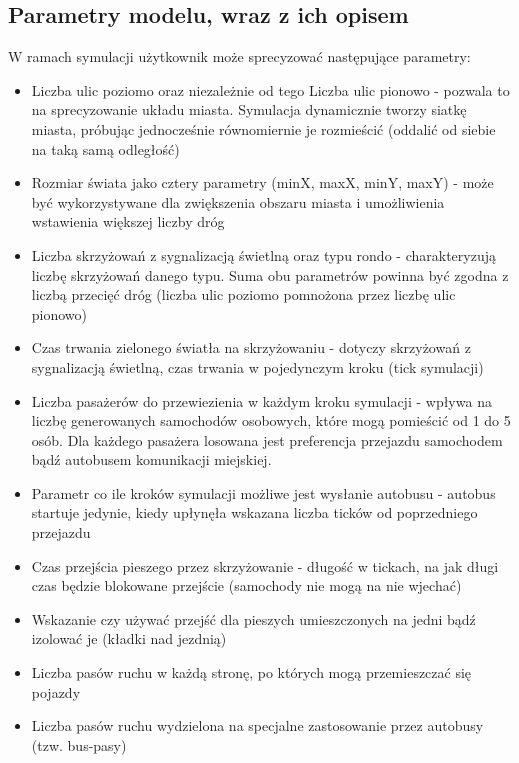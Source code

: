 \documentclass{article}
\begin{document}
\subsection{Parametry modelu, wraz z ich opisem}
\label{subsection:parametry}
W ramach symulacji użytkownik może sprecyzować następujące parametry:
\begin{itemize}
    \item Liczba ulic poziomo oraz niezależnie od tego Liczba ulic pionowo - pozwala to na sprecyzowanie układu miasta. Symulacja dynamicznie tworzy siatkę miasta, próbując jednocześnie równomiernie je rozmieścić (oddalić od siebie na taką samą odległość)
    \item Rozmiar świata jako cztery parametry (minX, maxX, minY, maxY) - może być wykorzystywane dla zwiększenia obszaru miasta i umożliwienia wstawienia większej liczby dróg
    \item Liczba skrzyżowań z sygnalizacją świetlną oraz typu rondo - charakteryzują liczbę skrzyżowań danego typu. Suma obu parametrów powinna być zgodna z liczbą przecięć dróg (liczba ulic poziomo pomnożona przez liczbę ulic pionowo)
    \item Czas trwania zielonego światła na skrzyżowaniu - dotyczy skrzyżowań z sygnalizacją świetlną, czas trwania w pojedynczym kroku (tick symulacji)
    \item Liczba pasażerów do przewiezienia w każdym kroku symulacji - wpływa na liczbę generowanych samochodów osobowych, które mogą pomieścić od 1 do 5 osób. Dla każdego pasażera losowana jest preferencja przejazdu samochodem bądź autobusem komunikacji miejskiej.
    \item Parametr co ile kroków symulacji możliwe jest wysłanie autobusu - autobus startuje jedynie, kiedy upłynęła wskazana liczba ticków od poprzedniego przejazdu
    \item Czas przejścia pieszego przez skrzyżowanie - długość w tickach, na jak długi czas będzie blokowane przejście (samochody nie mogą na nie wjechać)
    \item Wskazanie czy używać przejść dla pieszych umieszczonych na jedni bądź izolować je (kładki nad jezdnią)
    \item Liczba pasów ruchu w każdą stronę, po których mogą przemieszczać się pojazdy
    \item Liczba pasów ruchu wydzielona na specjalne zastosowanie przez autobusy (tzw. bus-pasy)
\end{itemize}
\end{document}
